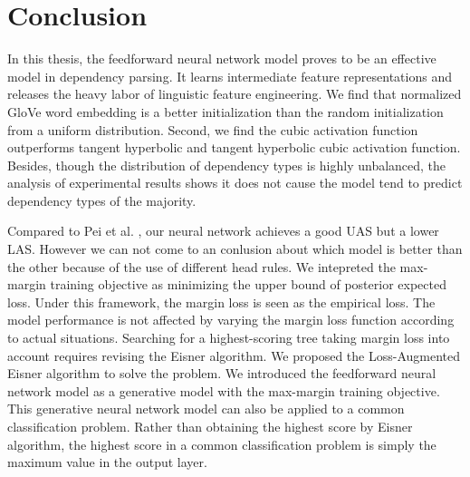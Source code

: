 
\chapter{Conclusion}
\label{cha:conclusion}
In this thesis, the feedforward neural network model proves to be an effective model in dependency parsing. It learns intermediate feature representations and releases the heavy labor of linguistic feature engineering. We find that normalized GloVe word embedding is a better initialization than the random initialization from a uniform distribution. Second, we find the cubic activation function outperforms tangent hyperbolic and tangent hyperbolic cubic activation function. Besides, though the distribution of dependency types is highly unbalanced, the analysis of experimental results shows it does not cause the model tend to predict dependency types of the majority.

Compared to Pei et al. \cite{pei2015}, our neural network achieves a good UAS but a lower LAS. However we can not come to an conlusion about which model is better than the other because of the use of different head rules. We intepreted the max-margin training objective as minimizing the upper bound of posterior expected loss. Under this framework, the margin loss is seen as the empirical loss. The model performance is not affected by varying the margin loss function according to actual situations. Searching for a highest-scoring tree taking margin loss into account requires revising the Eisner algorithm. We proposed the Loss-Augmented Eisner algorithm to solve the problem. We introduced the feedforward neural network model as a generative model with the max-margin training objective. This generative neural network model can also be applied to a common classification problem. Rather than obtaining the highest score by Eisner algorithm, the highest score in a common classification problem is simply the maximum value in the output layer.



